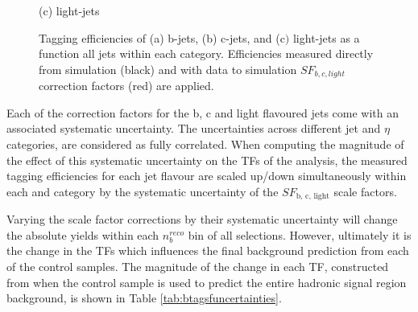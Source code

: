 \begin{figure}[ht]
\begin{minipage}[b]{0.38\linewidth}
\centering (c) light-jets
\end{minipage}
\caption[Tagging efficiencies of (a) b-jets, (b) c-jets, and (c$)$ light-jets determined from all jets within each \theht category. ]{Tagging efficiencies of (a) b-jets, (b) c-jets, and (c$)$ light-jets as a function all jets within each \theht category. Efficiencies measured directly from simulation (black) and with data to simulation $SF_{b,c,light}$ correction factors (red) are applied.}\label{fig:btagefficiency}
\end{figure}

\FloatBarrier

Each of the correction factors for the b, c and light flavoured jets come with an associated systematic uncertainty. The uncertainties across different jet \pt and $\eta$ categories, are considered as fully correlated. When computing the magnitude of the effect of this systematic uncertainty on the \ac{TF}s of the analysis, the measured tagging efficiencies for each jet flavour are scaled up/down simultaneously within each \theht and \njet category by the systematic uncertainty of the $SF_{\text{b, c, light}}$ scale factors. 

Varying the scale factor corrections by their systematic uncertainty will change the absolute yields within  each $n_{b}^{reco}$ bin of all selections. However, ultimately it is the change in the \ac{TF}s which influences the final background prediction from each of the control samples. The magnitude of the change in each \ac{TF}, constructed from when the \mupjets control sample is used to predict the entire hadronic signal region background, is shown in Table \ref{tab:btagsfuncertainties}. 


